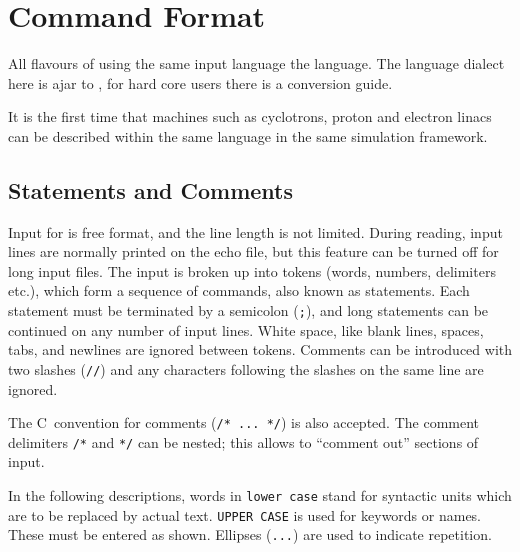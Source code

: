 \chapter{Command Format}
\label{sec:format}
All flavours of \opal using the same input language the \mad language. The language dialect here is
ajar to \madnine, for hard core \madeight users there is a conversion guide. 

 It is the first time that 
machines such as cyclotrons, proton and electron linacs can be described within the same language
in the same simulation framework.
\section{Statements and Comments}
\label{sec:statements}
Input for \opal is free format, and the line length is not limited.
During reading, input lines are normally printed on the echo file,
but this feature can be turned off for long input files.
The input is broken up into tokens (words, numbers, delimiters etc.),
which form a sequence of commands, also known as statements.
Each statement must be terminated by a semicolon (\texttt{;}),
and long statements can be continued on any number of input lines.
White space, like blank lines, spaces, tabs, 
and newlines are ignored between tokens.
Comments can be introduced with two slashes (\texttt{//}) 
and any characters following the slashes on the same line are ignored.

The C~convention for comments (\texttt{/* ... */}) is also accepted.
The comment delimiters \texttt{/*} and \texttt{*/} can be nested;
this allows to ``comment out'' sections of input.

In the following descriptions,
words in \texttt{lower case} stand for syntactic units
which are to be replaced by actual text.
\texttt{UPPER CASE} is used for keywords or names.
These must be entered as shown.
Ellipses (\texttt{...}) are used to indicate repetition.

